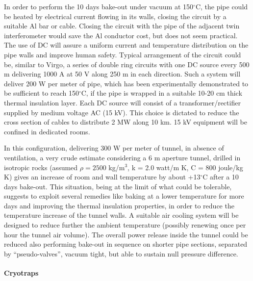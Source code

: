 In order to perform the 10 days bake-out under vacuum at 150$^{\circ}$C, the pipe could be heated by electrical current flowing in its walls, closing the circuit by a suitable Al bar or cable. Closing the circuit with the pipe of the adjacent twin interferometer would save the Al conductor cost, but does not seem practical. The use of DC will assure a uniform current and temperature distribution on the pipe walls and improve human safety. Typical arrangement of the circuit could be, similar to Virgo, a series of double ring circuits with one DC source every 500 m delivering 1000 A at 50 V along 250 m in each direction. Such a system will deliver 200 W per meter of pipe, which has been experimentally demonstrated to be sufficient to reach 150$^{\circ}$C, if the pipe is wrapped in a suitable 10-20 cm thick thermal insulation layer. Each DC source will consist of a transformer/rectifier supplied by medium voltage AC (15 kV). This choice is dictated to reduce the cross section of cables to distribute 2 MW along 10 km. 15 kV equipment will be confined in dedicated rooms.

In this configuration, delivering 300 W per meter of tunnel, in absence of ventilation, a very crude estimate considering a 6 m aperture tunnel, drilled in isotropic rocks (assumed  $\rho = 2500$ kg/m$^{3}$, k = 2.0 watt/m K, C = 800 joule/kg K) gives an increase of room and wall temperature by about +13$^{\circ}$C after a 10 days bake-out. This situation, being at the limit of what could be tolerable, suggests to exploit several remedies like baking at a lower temperature for more days and improving the thermal insulation properties, in order to reduce the temperature increase of the tunnel walls. A suitable air cooling system will be designed to reduce further the ambient temperature (possibly renewing once per hour the tunnel air volume). The overall power release inside the tunnel could be reduced also performing bake-out in sequence on shorter pipe sections, separated by ``pseudo-valves'', vacuum tight, but able to sustain null pressure difference.

\paragraph{Cryotraps}

